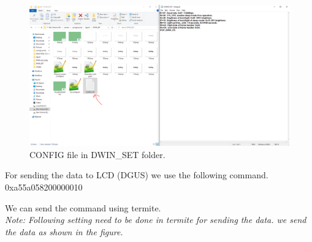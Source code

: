 \documentclass[12pt, A4]{article} %
\begin{document}
\begin{figure}[!htb] %
	\centering
	\includegraphics[width=15cm]{config} 
	\caption{CONFIG file in DWIN\_SET folder.\\}
\end{figure}

\newpage

For sending the data to LCD (DGUS) we use the following command.\\

{\huge 0xa55a058200000010\\}


We can send the command using termite.\\ 
\emph{Note: Following setting need to be done in termite for sending the data. we send the data as shown in the figure.}
\end{document}
